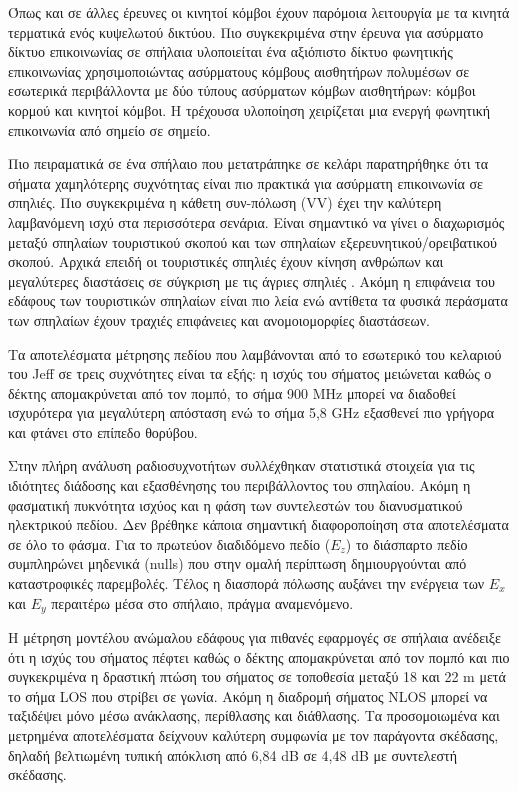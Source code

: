     Όπως και σε άλλες έρευνες οι κινητοί κόμβοι έχουν παρόμοια λειτουργία με τα κινητά τερματικά
    ενός κυψελωτού δικτύου. Πιο συγκεκριμένα στην έρευνα για ασύρματο δίκτυο επικοινωνίας σε
    σπήλαια \cite{yavuz_-cave_2009} υλοποιείται ένα αξιόπιστο δίκτυο φωνητικής επικοινωνίας
    χρησιμοποιώντας ασύρματους κόμβους αισθητήρων πολυμέσων σε εσωτερικά περιβάλλοντα με δύο
    τύπους ασύρματων κόμβων αισθητήρων: κόμβοι κορμού και κινητοί κόμβοι. Η τρέχουσα υλοποίηση
    χειρίζεται μια ενεργή φωνητική επικοινωνία από σημείο σε σημείο.

    Πιο πειραματικά σε ένα σπήλαιο που μετατράπηκε σε κελάρι \cite{soo_propagation_2018}
    παρατηρήθηκε ότι τα σήματα χαμηλότερης συχνότητας είναι πιο πρακτικά για ασύρματη
    επικοινωνία σε σπηλιές. Πιο συγκεκριμένα η κάθετη συν-πόλωση (VV) έχει την καλύτερη
    λαμβανόμενη ισχύ στα περισσότερα σενάρια.
    Είναι σημαντικό να γίνει ο διαχωρισμός μεταξύ σπηλαίων τουριστικού σκοπού και των σπηλαίων
    εξερευνητικού/ορειβατικού σκοπού. Αρχικά επειδή οι τουριστικές σπηλιές έχουν κίνηση ανθρώπων
    και μεγαλύτερες διαστάσεις σε σύγκριση με τις άγριες σπηλιές \cite{soo_propagation_2018}.
    Ακόμη η επιφάνεια του εδάφους των τουριστικών σπηλαίων είναι πιο λεία ενώ αντίθετα τα φυσικά
    περάσματα των σπηλαίων έχουν τραχιές επιφάνειες και ανομοιομορφίες διαστάσεων.

    Τα αποτελέσματα μέτρησης πεδίου που λαμβάνονται από το εσωτερικό του κελαριού του
    Jeff \cite{soo_propagation_2018} σε τρεις συχνότητες είναι τα εξής: η ισχύς του σήματος
    μειώνεται καθώς ο δέκτης απομακρύνεται από τον πομπό, το σήμα 900 MHz μπορεί να διαδοθεί
    ισχυρότερα για μεγαλύτερη απόσταση ενώ το σήμα 5,8 GHz εξασθενεί πιο γρήγορα και φτάνει στο 
    επίπεδο θορύβου.

    Στην πλήρη ανάλυση ραδιοσυχνοτήτων \cite{pingenot_full_2005} συλλέχθηκαν στατιστικά στοιχεία
    για τις ιδιότητες διάδοσης και εξασθένησης του περιβάλλοντος του σπηλαίου. Ακόμη η φασματική
    πυκνότητα ισχύος και η φάση των συντελεστών του διανυσματικού ηλεκτρικού πεδίου. Δεν βρέθηκε
    κάποια σημαντική διαφοροποίηση στα αποτελέσματα σε όλο το φάσμα. Για το πρωτεύον διαδιδόμενο
    πεδίο ($E_z$) το διάσπαρτο πεδίο συμπληρώνει μηδενικά (nulls) που στην ομαλή περίπτωση 
    δημιουργούνται από καταστροφικές παρεμβολές. Τέλος η διασπορά πόλωσης αυξάνει την ενέργεια
    των $E_x$ και $E_y$ περαιτέρω μέσα στο σπήλαιο, πράγμα αναμενόμενο.

    Η μέτρηση μοντέλου ανώμαλου εδάφους για πιθανές εφαρμογές σε σπήλαια \cite{soo_measurement_2019}
    ανέδειξε ότι η ισχύς του σήματος πέφτει καθώς ο δέκτης απομακρύνεται από τον πομπό και πιο
    συγκεκριμένα η δραστική πτώση του σήματος σε τοποθεσία μεταξύ 18 και 22 m μετά το σήμα LOS
    που στρίβει σε γωνία. Ακόμη η διαδρομή σήματος NLOS μπορεί να ταξιδέψει μόνο μέσω ανάκλασης,
    περίθλασης και διάθλασης. Τα προσομοιωμένα και μετρημένα αποτελέσματα δείχνουν καλύτερη συμφωνία
    με τον παράγοντα σκέδασης, δηλαδή βελτιωμένη τυπική απόκλιση από 6,84 dB σε 4,48 dB με συντελεστή
    σκέδασης.

